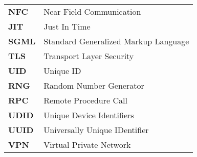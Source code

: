 \begin{table*}[htbp]
\begin{tabular}{p{3cm}p{12cm}}
		     \textbf{NFC} & Near Field Communication \\
             
             \textbf{JIT} & Just In Time \\		     
		     
		     \textbf{SGML} & Standard Generalized Markup Language \\
 		     
 		     \textbf{TLS} & Transport Layer Security \\
 		     
 		     \textbf{UID} & Unique ID \\
 		     
 		     \textbf{RNG} & Random Number Generator\\
 		     \textbf{RPC} & Remote Procedure Call \\
 		     
 		     \textbf{UDID} & Unique Device Identifiers\\
 		     \textbf{UUID} &  Universally Unique IDentifier \\
 		 	 
 		 	 \textbf{VPN} & Virtual Private Network \\
		\end{tabular}
\end{table*}